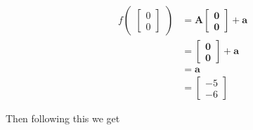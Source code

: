 \documentclass{article}
\begin{document}
\begin{align*}
    f\begin{pmatrix}
        \begin{bmatrix} 0 \\ 0\end{bmatrix}
    \end{pmatrix} &= \mathbf{A\begin{bmatrix} 0 \\ 0\end{bmatrix} + a} \\
                  &= \mathbf{\begin{bmatrix} 0 \\ 0\end{bmatrix} + a} \\
                  &= \mathbf{a} \\
                  &= \begin{bmatrix} -5 \\ -6\end{bmatrix}
\end{align*}

Then following this we get
\end{document}
